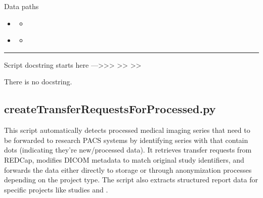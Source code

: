 \documentclass[letterpaper,10pt,english]{sphinxmanual}
\begin{document}
\sphinxAtStartPar
{}


\sphinxAtStartPar
{}


\sphinxAtStartPar
Data paths
\begin{itemize}
\item {} \begin{description}
\begin{itemize}
\item {} 
\sphinxAtStartPar
{}

\end{itemize}

\end{description}

\item {} \begin{description}
\begin{itemize}
\item {} 
\sphinxAtStartPar
{}

\end{itemize}

\end{description}

\end{itemize}


\bigskip\hrule\bigskip


\sphinxAtStartPar
Script docstring starts here —\textgreater{}\textgreater{}\textgreater{}
\textendash{}\textgreater{}\textgreater{}
\textendash{}\textgreater{}\textgreater{}

\sphinxAtStartPar
There is no docstring.

\sphinxstepscope


\subsection{createTransferRequestsForProcessed.py}
\label{\detokenize{Architecture/scripts/createTransferRequestsForProcessed:createtransferrequestsforprocessed-py}}\label{\detokenize{Architecture/scripts/createTransferRequestsForProcessed::doc}}
\sphinxAtStartPar
This script automatically detects processed medical imaging series that need to be forwarded to research PACS systems by identifying series with  that contain dots (indicating they’re new/processed data). It retrieves transfer requests from REDCap, modifies DICOM metadata to match original study identifiers, and forwards the data either directly to storage or through anonymization processes depending on the project type. The script also extracts structured report data for specific projects like  studies and .
\end{document}
